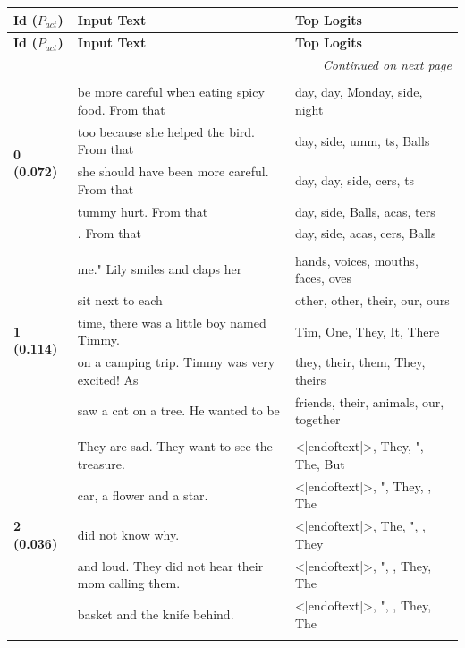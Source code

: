 \documentclass{article}
\theoremstyle{plain}
\theoremstyle{definition}
\theoremstyle{remark}
\begin{document}
\small
\begin{longtable}{|p{}|p{}|p{}|}
\hline
\textbf{Id ($P_{act}$)} & \textbf{Input Text} & \textbf{Top Logits} \\
\hline
\endfirsthead  %
\hline
\textbf{Id ($P_{act}$)} & \textbf{Input Text} & \textbf{Top Logits} \\
\hline
\endhead

\hline
\multicolumn{3}{r}{\textit{Continued on next page}} \\
\hline
\endfoot

\hline
\endlastfoot
& & \\
\multirow{5}{*}{\textbf{0 (0.072)}} & be more careful when eating spicy food. From that & day, day,  Monday, side, night \\
& too because she helped the bird. From that & day, side, umm, ts,  Balls \\
& she should have been more careful. From that & day, day, side, cers, ts \\
& tummy hurt. From that & day, side,  Balls, acas, ters \\
& . From that & day, side, acas, cers,  Balls \\
& & \\
\multirow{5}{*}{\textbf{1 (0.114)}} & me."  Lily smiles and claps her & hands,  voices,  mouths,  faces, oves \\
& sit next to each & other, other,  their,  our,  ours \\
& time, there was a little boy named Timmy. & Tim,  One,  They,  It,  There \\
& on a camping trip. Timmy was very excited!   As & they,  their,  them, They,  theirs \\
& saw a cat on a tree. He wanted to be & friends,  their,  animals,  our,  together \\
& & \\
\multirow{5}{*}{\textbf{2 (0.036)}} & They are sad. They want to see the treasure. & <|endoftext|>, They, ", The, But \\
& car, a flower and a star. & <|endoftext|>, ", They,  , The \\
& did not know why. & <|endoftext|>, The, ",  , They \\
& and loud. They did not hear their mom calling them. & <|endoftext|>, ",  , They, The \\
& basket and the knife behind. & <|endoftext|>, ",  , They, The \\
& & \\

\end{longtable}
\end{document}
